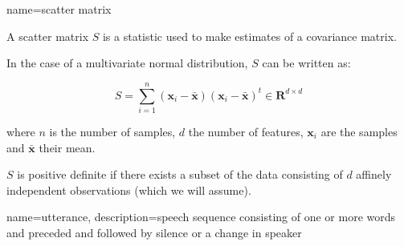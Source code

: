 {
    name=scatter matrix
}
{
A scatter matrix $S$ is a statistic used to make estimates of a covariance
matrix.

In the case of a multivariate normal distribution, $S$ can be written as:

$$S = \sum_{i=1}^n (\bm{x}_i - \bar{\bm{x}})
(\bm{x}_i - \bar{\bm{x}})^t \in \bm{R}^{d \times d}$$

where $n$ is the number of samples, $d$ the number of features, $\bm{x}_i$
are the samples and $\bar{\bm x}$ their mean.

$S$ is positive definite if there exists a subset of the data consisting of $d$
affinely independent observations (which we will assume).
}

{
    name=utterance,
    description={speech sequence consisting of one or more words and preceded
                 and followed by silence or a change in speaker}
}
